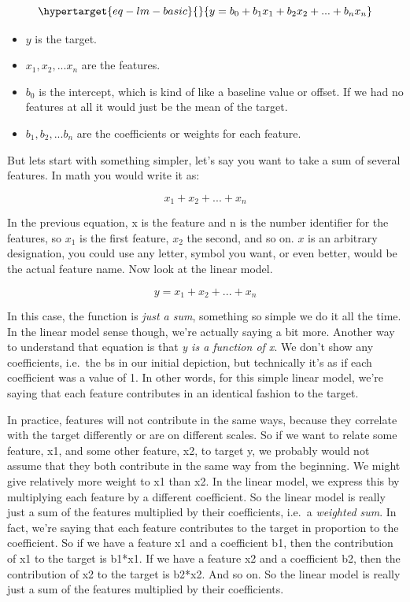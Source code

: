 \documentclass[
  letterpaper,
]{krantz}
\providecommand{\tightlist}{%
  \setlength{\itemsep}{0pt}\setlength{\parskip}{0pt}}\usepackage{longtable,booktabs,array}
\begin{document}
\begin{equation}\protect\hypertarget{eq-lm-basic}{}{
y = b_0 + b_1x_1 + b_2x_2 + ... + b_nx_n
}\label{eq-lm-basic}\end{equation}

\begin{itemize}
\tightlist
\item
  \(y\) is the target.
\item
  \(x_1, x_2, ... x_n\) are the features.
\item
  \(b_0\) is the intercept, which is kind of like a baseline value or
  offset. If we had no features at all it would just be the mean of the
  target.
\item
  \(b_1, b_2, ... b_n\) are the coefficients or weights for each
  feature.
\end{itemize}

But lets start with something simpler, let's say you want to take a sum
of several features. In math you would write it as:

\[
x_1 + x_2 + ... + x_n
\]

In the previous equation, x is the feature and n is the number
identifier for the features, so \(x_1\) is the first feature, \(x_2\)
the second, and so on. \(x\) is an arbitrary designation, you could use
any letter, symbol you want, or even better, would be the actual feature
name. Now look at the linear model.

\[
y = x_1 + x_2 + ... + x_n
\]

In this case, the function is \emph{just a sum}, something so simple we
do it all the time. In the linear model sense though, we're actually
saying a bit more. Another way to understand that equation is that
\emph{y is a function of x}. We don't show any coefficients, i.e.~the bs
in our initial depiction, but technically it's as if each coefficient
was a value of 1. In other words, for this simple linear model, we're
saying that each feature contributes in an identical fashion to the
target.

In practice, features will not contribute in the same ways, because they
correlate with the target differently or are on different scales. So if
we want to relate some feature, x1, and some other feature, x2, to
target y, we probably would not assume that they both contribute in the
same way from the beginning. We might give relatively more weight to x1
than x2. In the linear model, we express this by multiplying each
feature by a different coefficient. So the linear model is really just a
sum of the features multiplied by their coefficients, i.e.~a
\emph{weighted sum}. In fact, we're saying that each feature contributes
to the target in proportion to the coefficient. So if we have a feature
x1 and a coefficient b1, then the contribution of x1 to the target is
b1*x1. If we have a feature x2 and a coefficient b2, then the
contribution of x2 to the target is b2*x2. And so on. So the linear
model is really just a sum of the features multiplied by their
coefficients.
\end{document}
